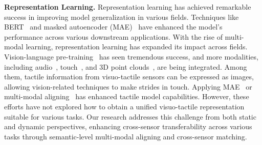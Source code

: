 \textbf{Representation Learning.} Representation learning has achieved remarkable success in improving model generalization in various fields. Techniques like BERT~\citep{devlin2018bert}  and masked autoencoder (MAE)~\citep{he2022masked}  have enhanced the model's performance across various downstream applications. 
With the rise of multi-modal learning, representation learning has expanded its impact across fields.
Vision-language pre-training~\citep{radford2021clip} has seen tremendous success, and more modalities, including audio~\citep{guzhov2022audioclip}, touch~\citep{yang2024binding}, and 3D point clouds~\citep{xue2023ulip}, are being integrated. Among them, tactile information from visuo-tactile sensors can be expressed as images, allowing vision-related techniques to make strides in touch.  Applying MAE~\citep{cao2023learn,higuerasparsh} or multi-modal aligning~\citep{yang2024binding, cheng2024touch100k} has enhanced tactile model capabilities. 
However, these efforts have not explored how to obtain a unified visuo-tactile representation suitable for various tasks.
Our research addresses this challenge from both static and dynamic perspectives, enhancing cross-sensor transferability across various tasks through semantic-level multi-modal aligning and cross-sensor matching.

